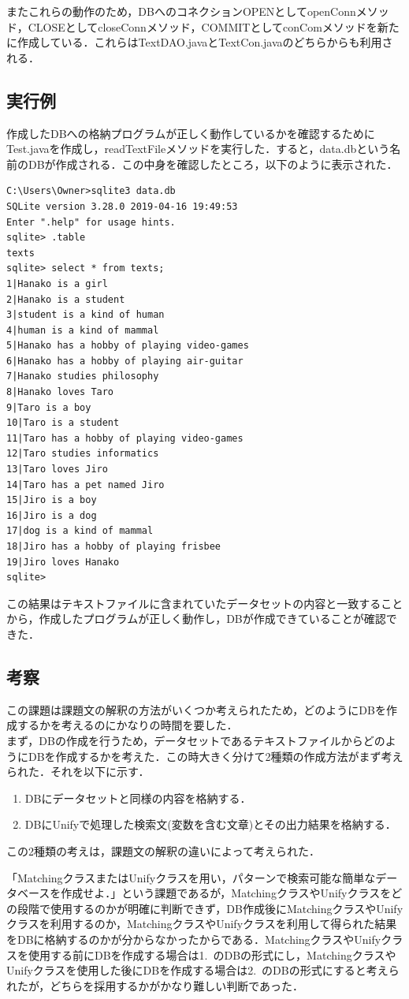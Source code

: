 \documentclass[12pt]{jarticle}
\begin{document}
またこれらの動作のため，DBへのコネクションOPENとしてopenConnメソッド，CLOSEとしてcloseConnメソッド，COMMITとしてconComメソッドを新たに作成している．これらはTextDAO.javaとTextCon.javaのどちらからも利用される．

\subsection{実行例}
作成したDBへの格納プログラムが正しく動作しているかを確認するためにTest.javaを作成し，readTextFileメソッドを実行した．すると，data.dbという名前のDBが作成される．この中身を確認したところ，以下のように表示された．
\begin{lstlisting}
C:\Users\Owner>sqlite3 data.db
SQLite version 3.28.0 2019-04-16 19:49:53
Enter ".help" for usage hints.
sqlite> .table
texts
sqlite> select * from texts;
1|Hanako is a girl
2|Hanako is a student
3|student is a kind of human
4|human is a kind of mammal
5|Hanako has a hobby of playing video-games
6|Hanako has a hobby of playing air-guitar
7|Hanako studies philosophy
8|Hanako loves Taro
9|Taro is a boy
10|Taro is a student
11|Taro has a hobby of playing video-games
12|Taro studies informatics
13|Taro loves Jiro
14|Taro has a pet named Jiro
15|Jiro is a boy
16|Jiro is a dog
17|dog is a kind of mammal
18|Jiro has a hobby of playing frisbee
19|Jiro loves Hanako
sqlite>
\end{lstlisting}
この結果はテキストファイルに含まれていたデータセットの内容と一致することから，作成したプログラムが正しく動作し，DBが作成できていることが確認できた．

\subsection{考察}
この課題は課題文の解釈の方法がいくつか考えられたため，どのようにDBを作成するかを考えるのにかなりの時間を要した．\\

まず，DBの作成を行うため，データセットであるテキストファイルからどのようにDBを作成するかを考えた．この時大きく分けて2種類の作成方法がまず考えられた．それを以下に示す．
\begin{enumerate}
\item DBにデータセットと同様の内容を格納する．
\item DBにUnifyで処理した検索文(変数を含む文章)とその出力結果を格納する．
\end{enumerate}
この2種類の考えは，課題文の解釈の違いによって考えられた．\par
「MatchingクラスまたはUnifyクラスを用い，パターンで検索可能な簡単なデータベースを作成せよ．」という課題であるが，MatchingクラスやUnifyクラスをどの段階で使用するのかが明確に判断できず，DB作成後にMatchingクラスやUnifyクラスを利用するのか，MatchingクラスやUnifyクラスを利用して得られた結果をDBに格納するのかが分からなかったからである．MatchingクラスやUnifyクラスを使用する前にDBを作成する場合は1.\ のDBの形式にし，MatchingクラスやUnifyクラスを使用した後にDBを作成する場合は2.\ のDBの形式にすると考えられたが，どちらを採用するかがかなり難しい判断であった．\\
\end{document}
